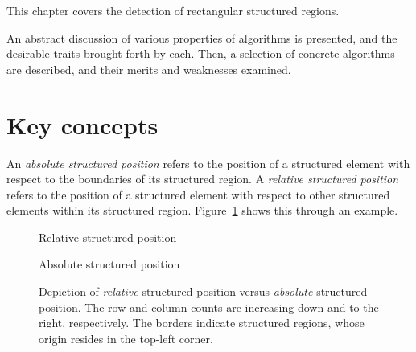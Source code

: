 This chapter covers the detection of rectangular structured regions.

An abstract discussion of various properties of algorithms is presented, and the desirable traits brought forth by each.
Then, a selection of concrete algorithms are described, and their merits and weaknesses examined.


\section{Key concepts}
An \emph{absolute structured position} refers to the position of a structured element with respect to the boundaries of its structured region.
A \emph{relative structured position} refers to the position of a structured element with respect to other structured elements within its structured region. Figure~\ref{fig:structured-position} shows this through an example.


\begin{figure}
\newcommand{\nodesize}{1.2}
\newcommand{\rows}{4}
\newcommand{\cols}{4}
\newcommand{\rowsize}{\rows*\nodesize}
\newcommand{\colsize}{\cols*\nodesize+2*0.1}

\newcommand{\nodeat}[3]{
	\pgfmathsetmacro{\lerow}{ (\rows - #1) * \nodesize - (\nodesize / 2) - 0.1}
	\pgfmathsetmacro{\lecol}{ (#2 * \nodesize) + (\nodesize / 2) + 0.1}
	\node at (\lecol, \lerow) {#3}
}

\sidebyside
{
	\caption{Relative structured position\label{fig:relative-structured-position}}
}
{
	\caption{Absolute structured position\label{fig:absolute-structured-position}}
}
\caption{Depiction of \emph{relative} structured position versus \emph{absolute} structured position. The row and column counts are increasing down and to the right, respectively. The borders indicate structured regions, whose origin resides in the top-left corner.\label{fig:structured-position}}
\end{figure}



